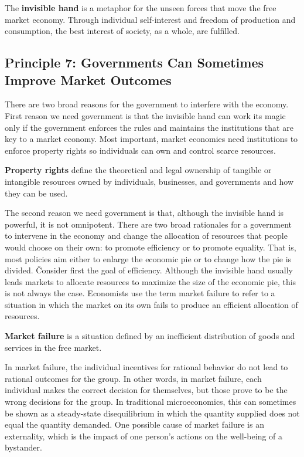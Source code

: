 The \textbf{invisible hand} is a metaphor for the unseen forces that move the free market economy. Through individual
self-interest and freedom of production and consumption, the best interest of society, as a whole, are fulfilled.
\ed

\subsection*{Principle 7: Governments Can Sometimes Improve Market Outcomes}

There are two broad reasons for the government to interfere with the economy. First reason we need government is that
the invisible hand can work its magic only if the government enforces the rules and maintains the institutions that
are key to a market economy. Most important, market economies need institutions to enforce property rights so
individuals can own and control scarce resources.


\textbf{Property rights} define the theoretical and legal ownership of tangible or intangible resources owned by
individuals, businesses, and governments and how they can be used.
\ed

The second reason we need government is that, although the invisible hand is powerful, it is not omnipotent. There
are two broad rationales for a government to intervene in the economy and change the allocation of resources that
people would choose on their own: to promote efficiency or to promote equality. That is, most policies aim either to
enlarge the economic pie or to change how the pie is divided. \v

Consider first the goal of efficiency. Although the invisible hand usually leads markets to allocate resources to
maximize the size of the economic pie, this is not always the case. Economists use the term market failure to refer
to a situation in which the market on its own fails to produce an efficient allocation of resources.

\textbf{Market failure} is a situation defined by an inefficient distribution of goods and services in the free
market.
\ed

In market failure, the individual incentives for rational behavior do not lead to rational outcomes for the group. In
other words, in market failure, each individual makes the correct decision for themselves, but those prove to be the
wrong decisions for the group. In traditional microeconomics, this can sometimes be shown as a steady-state
disequilibrium in which the quantity supplied does not equal the quantity demanded. One possible cause of market
failure is an externality, which is the impact of one person's actions on the well-being of a bystander.

